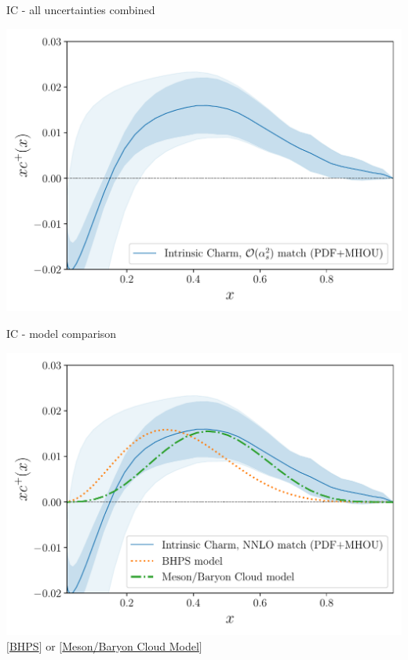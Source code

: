 \documentclass[9pt]{beamer}
\providecommand{\iRef}[1]{{\color{mLightGreen}\small $[$#1$]$}}
\begin{document}
\begin{frame}{IC - all uncertainties combined}
	\begin{center}
		\includegraphics[width=\linewidth]{3fns_Quad_MHOU.pdf}
	\end{center}
\end{frame}
\begin{frame}{IC - model comparison}
	\begin{center}
		\includegraphics[width=.9\linewidth]{nf3_to_models.pdf}\\
		\iRef{\href{https://doi.org/10.1016/0370-2693(80)90364-0}{BHPS}} or \iRef{\href{https://doi.org/10.1103/PhysRevD.89.074008}{Meson/Baryon Cloud Model}}
	\end{center}
\end{frame}
\end{document}
